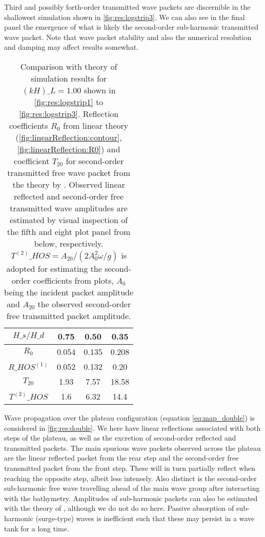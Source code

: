 Third and possibly forth-order transmitted wave packets are discernible in the shallowest simulation shown in \autoref{fig:res:logstrip3}.
We can also see in the final panel the emergence of what is likely the second-order sub-harmonic transmitted wave packet. 
Note that wave packet stability and also the numerical resolution and damping may affect results somewhat. 
\\


\begin{table}[h!ptb]%
\centering
\begin{tabular}{c|ccc}
$H\_s/H\_d$ & 0.75 & 0.50 & 0.35\\\hline
$R_0$ & 0.054 & 0.135 & 0.208 \\
$R\_{HOS}^{(1)}$ &  0.052 & 0.132 & 0.20\\\hline
$T_{20}$ & 1.93 & 7.57& 18.58 \\
$T^{(2)}\_{HOS}$ & 1.6 & 6.32 & 14.4
\end{tabular}
\caption{
Comparison with theory of simulation results for $(kH)\_L=1.00$ shown in \autoref{fig:res:logstrip1} to \ref{fig:res:logstrip3}.
Reflection coefficients $R_0$ from linear theory (\autoref{fig:linearReflection:contour}, \ref{fig:linearReflection:R0})
and coefficient $T_{20}$ for second-order transmitted free wave packet from the theory by \citet{li_2021_step1}.
Observed linear reflected and second-order free transmitted wave amplitudes are estimated by visual inspection of the fifth and eight plot panel from below, respectively.
$T^{(2)}\_{HOS} = A_{20}/(2A_0^2 \omega/g)$ is adopted for estimating the second-order coefficients from plots, $A_0$ being the incident packet amplitude and $A_{20}$ the observed second-order free transmitted packet amplitude. 
}
\label{tab:compareTheory}
\end{table}



Wave propagation over the plateau configuration (equation \ref{eq:map_double}) is considered in \autoref{fig:res:double}.
We here have linear reflections associated with both steps of the plateau, as well as the excretion of second-order reflected and transmitted packets.
The main spurious wave packets observed across the plateau are the linear reflected packet from the rear step and the second-order free transmitted packet from the front step. 
These will in turn partially reflect when reaching the opposite step, albeit less intensely. 
Also distinct is the second-order sub-harmonic free wave travelling ahead of the main wave group after interacting with the bathymetry. 
Amplitudes of  sub-harmonic packets can also be estimated with the theory of \citet{li_2021_step1}, although we do not do so here. 
Passive absorption of sub-harmonic  (surge-type) waves is inefficient such that these may persist in a wave tank for a long time.

